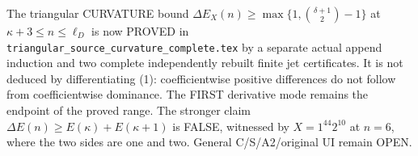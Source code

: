 The triangular CURVATURE bound
$\Delta E_X(n)\ge\max\{1,\binom{\delta+1}{2}-1\}$ at
$\kappa+3\le n\le\ell_D$ is now PROVED in
\texttt{triangular\_source\_curvature\_complete.tex} by a separate
actual append induction and two complete independently rebuilt finite
jet certificates. It is not deduced by differentiating (1): coefficientwise
positive differences do not follow from coefficientwise dominance.
The FIRST derivative mode remains the endpoint of the proved range.
The stronger claim $\Delta E(n)\ge E(\kappa)+E(\kappa+1)$
is FALSE, witnessed by $X=1^{44}2^{10}$ at $n=6$, where the
two sides are one and two. General C/S/A2/original UI remain OPEN.
